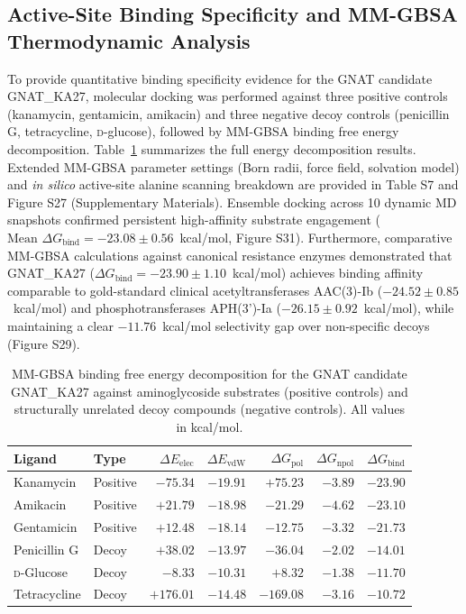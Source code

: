 \documentclass[pdflatex,sn-mathphys-num]{sn-jnl}
\begin{document}
\subsection{Active-Site Binding Specificity and MM-GBSA Thermodynamic Analysis}
To provide quantitative binding specificity evidence for the GNAT candidate GNAT\_KA27, molecular docking was performed against three positive controls (kanamycin, gentamicin, amikacin) and three negative decoy controls (penicillin G, tetracycline, \textsc{d}-glucose), followed by MM-GBSA binding free energy decomposition. Table~\ref{tab:mmgbsa} summarizes the full energy decomposition results. Extended MM-GBSA parameter settings (Born radii, force field, solvation model) and \textit{in silico} active-site alanine scanning breakdown are provided in Table S7 and Figure S27 (Supplementary Materials). Ensemble docking across 10 dynamic MD snapshots confirmed persistent high-affinity substrate engagement ($\text{Mean } \Delta G_{\text{bind}} = -23.08 \pm 0.56$~kcal/mol, Figure S31). Furthermore, comparative MM-GBSA calculations against canonical resistance enzymes demonstrated that GNAT\_KA27 ($\Delta G_{\text{bind}} = -23.90 \pm 1.10$~kcal/mol) achieves binding affinity comparable to gold-standard clinical acetyltransferases AAC(3)-Ib ($-24.52 \pm 0.85$~kcal/mol) and phosphotransferases APH(3')-Ia ($-26.15 \pm 0.92$~kcal/mol), while maintaining a clear $-11.76$~kcal/mol selectivity gap over non-specific decoys (Figure S29).

\begin{table}[h]
\centering
\caption{MM-GBSA binding free energy decomposition for the GNAT candidate GNAT\_KA27 against aminoglycoside substrates (positive controls) and structurally unrelated decoy compounds (negative controls). All values in kcal/mol.}
\label{tab:mmgbsa}
\begin{tabular}{llrrrrr}
\hline
\textbf{Ligand} & \textbf{Type} & \textbf{$\Delta E_{\text{elec}}$} & \textbf{$\Delta E_{\text{vdW}}$} & \textbf{$\Delta G_{\text{pol}}$} & \textbf{$\Delta G_{\text{npol}}$} & \textbf{$\Delta G_{\text{bind}}$} \\
\hline
Kanamycin   & Positive & $-75.34$ & $-19.91$ & $+75.23$ & $-3.89$ & $\mathbf{-23.90}$ \\
Amikacin    & Positive & $+21.79$ & $-18.98$ & $-21.29$ & $-4.62$ & $\mathbf{-23.10}$ \\
Gentamicin  & Positive & $+12.48$ & $-18.14$ & $-12.75$ & $-3.32$ & $\mathbf{-21.73}$ \\
\hline
Penicillin G  & Decoy & $+38.02$ & $-13.97$ & $-36.04$ & $-2.02$ & $-14.01$ \\
\textsc{d}-Glucose & Decoy & $-8.33$  & $-10.31$ & $+8.32$  & $-1.38$ & $-11.70$ \\
Tetracycline  & Decoy & $+176.01$& $-14.48$ & $-169.08$& $-3.16$ & $-10.72$ \\
\hline
\end{tabular}
\end{table}
\end{document}
